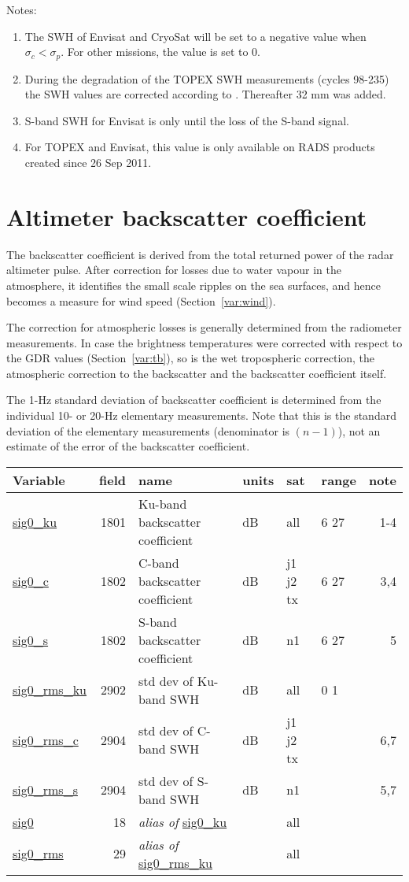 \documentclass[a4paper,11pt,openany,natbib]{thesis}
\makeatletter
\newcommand\var[1]{\url{#1}\index{variables!#1@\protect\url{#1}}}
\newcommand\alias[1]{\emph{alias of} \var{#1}}
\newenvironment{vartable}{
\begin{table}[ht]
\small
\begin{tabular}{lrllllr}
\hline
Variable & field & name & units & sat & range & note \\
\hline
}{
\hline
\end{tabular}
\end{table}
}
\makeatother
\begin{document}
Notes:
\begin{enumerate}
\item The SWH of Envisat and CryoSat will be set to a negative value when $\sigma_c<\sigma_p$. For other missions, the value is set to 0.
\item During the degradation of the TOPEX SWH measurements (cycles 98-235) the SWH values are corrected according to \citet{queffeulou2004}. Thereafter 32 mm was added.
\item S-band SWH for Envisat is only until the loss of the S-band signal.
\item For TOPEX and Envisat, this value is only available on RADS products created since 26 Sep 2011.
\end{enumerate}

\section{Altimeter backscatter coefficient}
\label{var:sig0}
The backscatter coefficient is derived from the total returned power of the radar altimeter pulse. After correction for losses due to water vapour in the atmosphere, it identifies the small scale ripples on the sea surfaces, and hence becomes a measure for wind speed (Section~\ref{var:wind}).

The correction for atmospheric losses is generally determined from the radiometer measurements. In case the brightness temperatures were corrected with respect to the GDR values (Section~\ref{var:tb}), so is the wet tropospheric correction, the atmospheric correction to the backscatter and the backscatter coefficient itself.

The 1-Hz standard deviation of backscatter coefficient is determined from the individual 10- or 20-Hz elementary measurements. Note that this is the standard deviation of the elementary measurements (denominator is $(n-1)$), not an estimate of the error of the backscatter coefficient.

\begin{vartable}
\var{sig0_ku} & 1801 & Ku-band backscatter coefficient & dB & all & 6 27 & 1-4 \\
\var{sig0_c} & 1802 & C-band backscatter coefficient & dB & j1 j2 tx & 6 27 & 3,4 \\
\var{sig0_s} & 1802 & S-band backscatter coefficient & dB & n1 & 6 27 & 5 \\
\var{sig0_rms_ku} & 2902 & std dev of Ku-band SWH & dB & all & 0 1 & \\
\var{sig0_rms_c} & 2904 & std dev of C-band SWH & dB & j1 j2 tx & & 6,7 \\
\var{sig0_rms_s} & 2904 & std dev of S-band SWH & dB & n1 & & 5,7 \\
\hline
\var{sig0} & 18 & \alias{sig0_ku} && all && \\
\var{sig0_rms} & 29 & \alias{sig0_rms_ku} && all && \\
\end{vartable}
\end{document}
